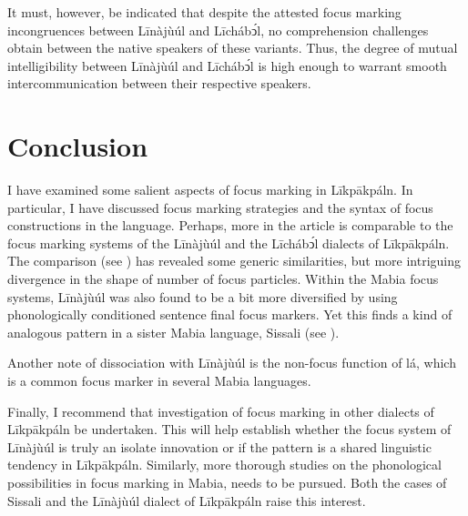 \documentclass[output=paper,colorlinks,citecolor=brown]{langscibook}
\begin{document}
It must, however, be indicated that despite the attested focus marking incongruences between Līnàjùúl and Līchábͻ́l, no comprehension challenges obtain between the native speakers of these variants. Thus, the degree of mutual intelligibility between Līnàjùúl and Līchábͻ́l is high enough to warrant smooth intercommunication between their respective speakers.

\section{Conclusion}\label{sec:bisilki:9}

I have examined some salient aspects of focus marking in Līkpākpáln. In particular, I have discussed focus marking strategies and the syntax of focus constructions in the language. Perhaps, more in the article is comparable to the focus marking systems of the Līnàjùúl and the Līchábͻ́l dialects of Līkpākpáln. The comparison (see ) has revealed some generic similarities, but more intriguing divergence in the shape of number of focus particles. Within the Mabia focus systems, Līnàjùúl was also found to be a bit more diversified by using phonologically conditioned sentence final focus markers. Yet this finds a kind of analogous pattern in a sister Mabia language, Sissali (see ).

Another note of dissociation with Līnàjùúl is the non-focus function of lá, which is a common focus marker in several Mabia languages.

Finally, I recommend that investigation of focus marking in other dialects of Līkpākpáln be undertaken. This will help establish whether the focus system of Līnàjùúl is truly an isolate innovation or if the pattern is a shared linguistic tendency in Līkpākpáln. Similarly, more thorough studies on the phonological possibilities in focus marking in Mabia, needs to be pursued. Both the cases of Sissali and the Līnàjùúl dialect of Līkpākpáln raise this interest.
\end{document}
